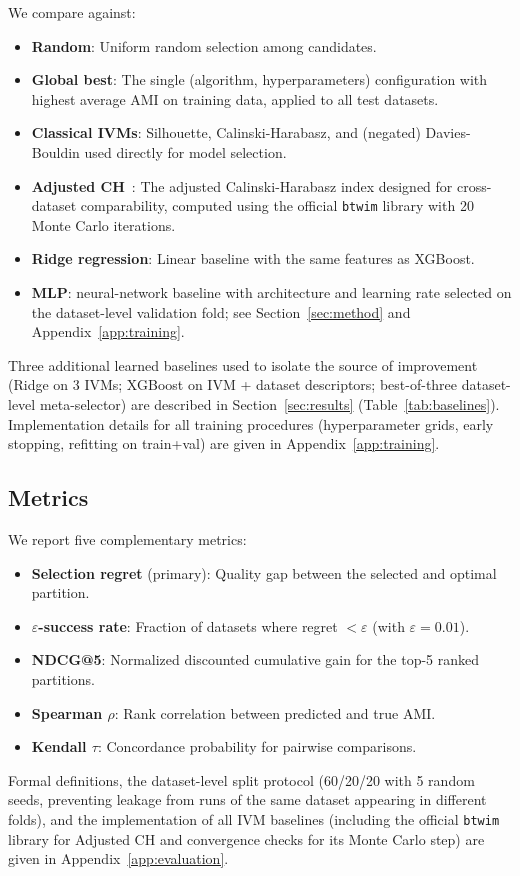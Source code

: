 \documentclass[10pt]{article} %
\begin{document}
We compare against:
\begin{itemize}
    \item \textbf{Random}: Uniform random selection among candidates.
    \item \textbf{Global best}: The single (algorithm, hyperparameters) configuration with highest average AMI on training data, applied to all test datasets.
    \item \textbf{Classical IVMs}: Silhouette, Calinski-Harabasz, and (negated) Davies-Bouldin used directly for model selection.
    \item \textbf{Adjusted CH}~\citep{jeon2025measuring}: The adjusted Calinski-Harabasz index designed for cross-dataset comparability, computed using the official \texttt{btwim} library with 20 Monte Carlo iterations.
    \item \textbf{Ridge regression}: Linear baseline with the same features as XGBoost.
    \item \textbf{MLP}: neural-network baseline with architecture and learning rate selected on the dataset-level validation fold; see Section~\ref{sec:method} and Appendix~\ref{app:training}.
\end{itemize}
Three additional learned baselines used to isolate the source of improvement (Ridge on 3 IVMs; XGBoost on IVM + dataset descriptors; best-of-three dataset-level meta-selector) are described in Section~\ref{sec:results} (Table~\ref{tab:baselines}). Implementation details for all training procedures (hyperparameter grids, early stopping, refitting on train+val) are given in Appendix~\ref{app:training}.

\subsection{Metrics}

We report five complementary metrics:
\begin{itemize}
    \item \textbf{Selection regret} (primary): Quality gap between the selected and optimal partition.
    \item \textbf{$\varepsilon$-success rate}: Fraction of datasets where regret $< \varepsilon$ (with $\varepsilon = 0.01$).
    \item \textbf{NDCG@5}: Normalized discounted cumulative gain for the top-5 ranked partitions.
    \item \textbf{Spearman $\rho$}: Rank correlation between predicted and true AMI.
    \item \textbf{Kendall $\tau$}: Concordance probability for pairwise comparisons.
\end{itemize}
Formal definitions, the dataset-level split protocol (60/20/20 with 5 random seeds, preventing leakage from runs of the same dataset appearing in different folds), and the implementation of all IVM baselines (including the official \texttt{btwim} library for Adjusted CH and convergence checks for its Monte Carlo step) are given in Appendix~\ref{app:evaluation}.
\end{document}
